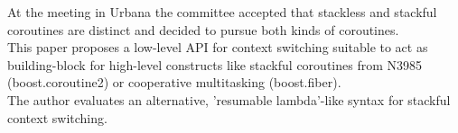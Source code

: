 At the meeting in Urbana the committee accepted that stackless and stackful
coroutines are distinct and decided to pursue both kinds of coroutines.\\
This paper proposes a low-level API for context switching suitable to act as 
building-block for high-level constructs like stackful coroutines from
N3985\cite{N3985} (boost.coroutine2\cite{bcoroutine2}) or cooperative
multitasking (boost.fiber\cite{bfiber}).\\
The author evaluates an alternative, 'resumable lambda'-like syntax for
stackful context switching.
